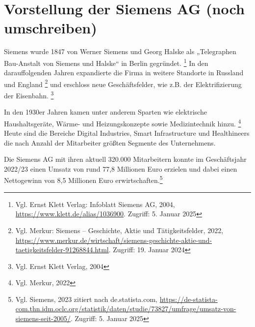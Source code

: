 \chapter{Vorstellung der Siemens AG (noch umschreiben)}\label{ch:data}

Siemens wurde 1847 von Werner Siemens und Georg Halske als „Telegraphen Bau-Anstalt von Siemens und Halske“ in Berlin gegründet.
\footnote{Vgl. Ernst Klett Verlag: Infoblatt Siemens AG, 2004, \url{https://www.klett.de/alias/1036900}. Zugriff: 5. Januar 2025} 
In den darauffolgenden Jahren expandierte die Firma in weitere Standorte in Russland und England \footnote{Vgl. Merkur: Siemens – Geschichte, 
Aktie und Tätigkeitsfelder, 2022, \url{https://www.merkur.de/wirtschaft/siemens-geschichte-aktie-und-taetigkeitsfelder-91268844.html}. 
Zugriff: 19. Januar 2024} und erschloss neue Geschäftsfelder, wie z.B. der Elektrifizierung der Eisenbahn. \footnote{Vgl. Ernst Klett Verlag, 2004}

In den 1930er Jahren kamen unter anderem Sparten wie elektrische Haushaltsgeräte, Wärme- und Heizungskonzepte sowie Medizintechnik hinzu.
\footnote{Vgl. Merkur, 2022} Heute sind die Bereiche Digital Industries, Smart Infrastructure und Healthineers die nach Anzahl der Mitarbeiter 
größten Segmente des Unternehmens. 

Die Siemens AG mit ihren aktuell 320.000 Mitarbeitern konnte im Geschäftsjahr 2022/23 einen Umsatz von rund 77,8 Millionen Euro erzielen und 
dabei einen Nettogewinn von 8,5 Millionen Euro erwirtschaften.\footnote{Vgl. Siemens, 2023 zitiert nach de.statista.com, 
\url{https://de-statista-com.thn.idm.oclc.org/statistik/daten/studie/73827/umfrage/umsatz-von-siemens-seit-2005/}. Zugriff: 5. Januar 2025}
